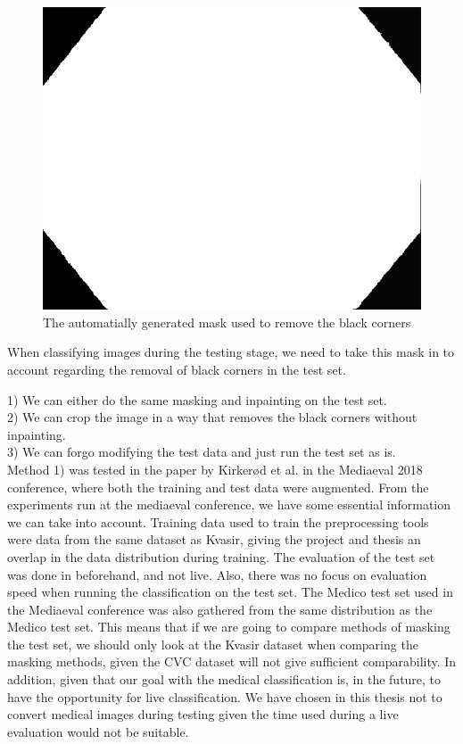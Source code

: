 \begin{figure}[h]
\centering
\includegraphics[scale=0.3]{experiments/figures/default-corner.png}
\caption{The automatially generated mask used to remove the black corners}
\label{fig:corner_mask}
\end{figure}

When classifying images during the testing stage, we need to take this mask in to account regarding the removal of black corners in the test set.

1) We can either do the same masking and inpainting on the test set. \\
2) We can crop the image in a way that removes the black corners without inpainting.\\
3) We can forgo modifying the test data and just run the test set as is. \\

Method 1)  was tested in the paper by Kirkerød et al. in the Mediaeval 2018 conference, where both the training and test data were augmented.
From the experiments run at the mediaeval conference, we have some essential information we can take into account.  
Training data used to train the preprocessing tools were data from the same dataset as Kvasir, giving the project and thesis an overlap in the data distribution during training. 
The evaluation of the test set was done in beforehand, and not live. Also, there was no focus on evaluation speed when running the classification on the test set. The Medico test set used in the Mediaeval conference was also gathered from the same distribution as the Medico test set. This means that if we are going to compare methods of masking the test set, we should only look at the Kvasir dataset when comparing the masking methods, given the CVC dataset will not give sufficient comparability.
In addition, given that our goal with the medical classification is, in the future, to have the opportunity for live classification. We have chosen in this thesis not to convert medical images during testing given the time used during a live evaluation would not be suitable. 


